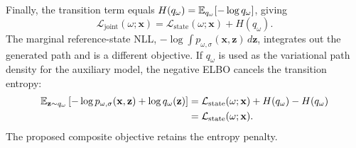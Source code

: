 Finally, the transition term equals $H(q_\omega)=\mathbb E_{q_\omega}[-\log q_\omega]$, giving
\begin{equation}\label{eq:joint-training-loss-entropy}
 \mathcal L_{\mathrm{joint}}(\omega;\mathbf x)
 =\mathcal L_{\mathrm{state}}(\omega;\mathbf x)+H(q_\omega).
\end{equation}
The marginal reference-state NLL, $-\log\int p_{\omega,\sigma}(\mathbf x,\mathbf z)\,d\mathbf z$, integrates out the generated path and is a different objective. If $q_\omega$ is used as the variational path density for the auxiliary model, the negative ELBO cancels the transition entropy:
\begin{equation}\label{eq:joint-versus-elbo}
 \begin{aligned}
 \mathbb E_{\mathbf z\sim q_\omega}
 \left[-\log p_{\omega,\sigma}(\mathbf x,\mathbf z)+\log q_\omega(\mathbf z)\right]
 &=\mathcal L_{\mathrm{state}}(\omega;\mathbf x)+H(q_\omega)-H(q_\omega)\\
 &=\mathcal L_{\mathrm{state}}(\omega;\mathbf x).
 \end{aligned}
\end{equation}
The proposed composite objective retains the entropy penalty.
